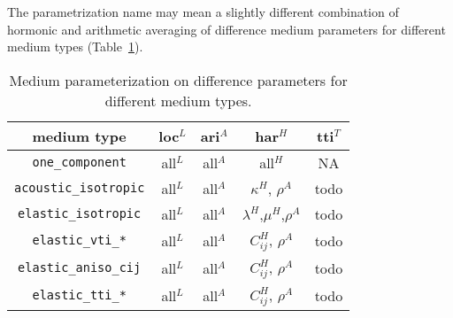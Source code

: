 The parametrization name may mean a slightly different combination of hormonic and arithmetic
averaging of difference medium parameters for different medium types (Table~\ref{table_parameterization}).

\begin{table}[h!]
\centering
\begin{tabular}{| c | c | c | c | c |}
\hline
   medium type               &   loc$^L$   &   ari$^A$   & har$^H$  & tti$^T$ \\
\hline
   \verb|one_component|      &    all$^L$  &   all$^A$   & all$^H$  &  NA \\
\hline
   \verb|acoustic_isotropic| &    all$^L$  &   all$^A$   &$\kappa^H$, $\rho^A$ & todo \\
\hline
   \verb|elastic_isotropic|  &    all$^L$  &   all$^A$   &$\lambda^H$,$\mu^H$,$\rho^A$ &  todo \\
\hline
   \verb|elastic_vti_*|      &    all$^L$  &   all$^A$   &$C_{ij}^H$, $\rho^A$ & todo \\
\hline
   \verb|elastic_aniso_cij|  &    all$^L$  &   all$^A$   &$C_{ij}^H$, $\rho^A$ & todo \\
\hline
   \verb|elastic_tti_*|      &    all$^L$  &   all$^A$   &$C_{ij}^H$, $\rho^A$ & todo \\
\hline
\end{tabular}
\caption{Medium parameterization on difference parameters for different medium types.}
\label{table_parameterization}
\end{table}



